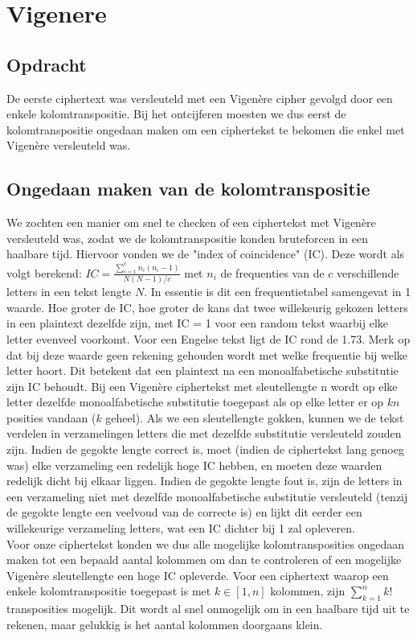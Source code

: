 
\section{Vigenere}
\subsection{Opdracht}
De eerste ciphertext was versleuteld met een Vigen\`ere cipher gevolgd door een enkele kolomtranspositie. Bij het ontcijferen moesten we dus eerst de kolomtranspositie ongedaan maken om een ciphertekst te bekomen die enkel met Vigen\`ere versleuteld was. 

\subsection{Ongedaan maken van de kolomtranspositie}
We zochten een manier om snel te checken of een ciphertekst met Vigen\`ere versleuteld was, zodat we de kolomtranspositie konden bruteforcen in een haalbare tijd. Hiervoor vonden we de "index of coincidence" (IC). Deze wordt als volgt berekend: $IC = \frac{\sum_{i=1}^{c}n_i(n_i -1)}{N(N-1)/c}$ met $n_i$ de frequenties van de $c$ verschillende letters in een tekst lengte $N$. In essentie is dit een frequentietabel samengevat in 1 waarde. Hoe groter de IC, hoe groter de kans dat twee willekeurig gekozen letters in een plaintext dezelfde zijn, met IC = 1 voor een random tekst waarbij elke letter evenveel voorkomt. Voor een Engelse tekst ligt de IC rond de 1.73. Merk op dat bij deze waarde geen rekening gehouden wordt met welke frequentie bij welke letter hoort. Dit betekent dat een plaintext na een monoalfabetische substitutie zijn IC behoudt. Bij een Vigen\`ere ciphertekst met sleutellengte n wordt op elke letter dezelfde monoalfabetische substitutie toegepast als op elke letter er op $kn$ posities vandaan ($k$ geheel). Als we een sleutellengte gokken, kunnen we de tekst verdelen in verzamelingen letters die met dezelfde substitutie versleuteld zouden zijn. Indien de gegokte lengte correct is, moet (indien de ciphertekst lang genoeg was) elke verzameling een redelijk hoge IC hebben, en moeten deze waarden redelijk dicht bij elkaar liggen. Indien de gegokte lengte fout is, zijn de letters in een verzameling niet met dezelfde monoalfabetische substitutie versleuteld (tenzij de gegokte lengte een veelvoud van de correcte is) en lijkt dit eerder een willekeurige verzameling letters, wat een IC dichter bij 1 zal opleveren. \\
Voor onze ciphertekst konden we dus alle mogelijke kolomtransposities ongedaan maken tot een bepaald aantal kolommen om dan te controleren of een mogelijke Vigen\`ere sleutellengte een hoge IC opleverde. Voor een ciphertext waarop een enkele kolomtranspositie toegepast is met $k \in [1,n]$ kolommen, zijn $\sum_{k=1}^{n}k!$ transposities mogelijk. Dit wordt al snel onmogelijk om in een haalbare tijd uit te rekenen, maar gelukkig is het aantal kolommen doorgaans klein. \\
